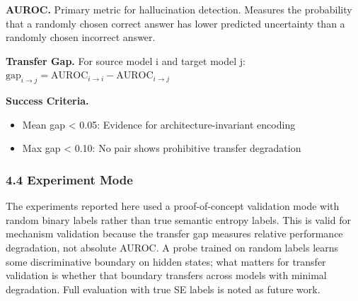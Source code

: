\textbf{AUROC.} Primary metric for hallucination detection. Measures the probability that a randomly chosen correct answer has lower predicted uncertainty than a randomly chosen incorrect answer.

\textbf{Transfer Gap.} For source model i and target model j:
$\text{gap}_{i\rightarrow j} = \text{AUROC}_{i\rightarrow i} - \text{AUROC}_{i\rightarrow j}$

\textbf{Success Criteria.}
\begin{itemize}
\item Mean gap < 0.05: Evidence for architecture-invariant encoding
\item Max gap < 0.10: No pair shows prohibitive transfer degradation
\end{itemize}

\subsubsection{4.4 Experiment Mode}

The experiments reported here used a proof-of-concept validation mode with random binary labels rather than true semantic entropy labels. This is valid for mechanism validation because the transfer gap measures relative performance degradation, not absolute AUROC. A probe trained on random labels learns some discriminative boundary on hidden states; what matters for transfer validation is whether that boundary transfers across models with minimal degradation. Full evaluation with true SE labels is noted as future work.

